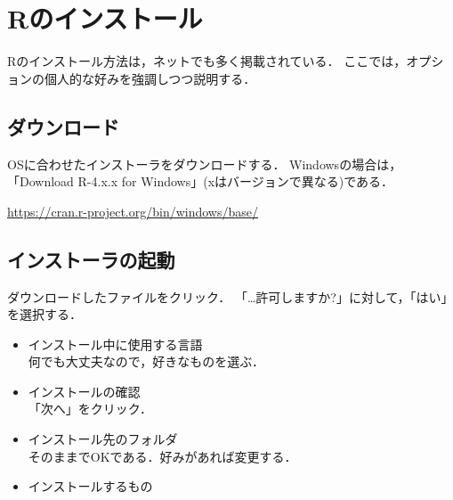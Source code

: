 \documentclass[
]{article}
\providecommand{\tightlist}{%
  \setlength{\itemsep}{0pt}\setlength{\parskip}{0pt}}
\begin{document}
\hypertarget{install}{%
\section{Rのインストール}\label{install}}

Rのインストール方法は，ネットでも多く掲載されている．
ここでは，オプションの個人的な好みを強調しつつ説明する．

\hypertarget{ux30c0ux30a6ux30f3ux30edux30fcux30c9}{%
\subsection{ダウンロード}\label{ux30c0ux30a6ux30f3ux30edux30fcux30c9}}

OSに合わせたインストーラをダウンロードする．
Windowsの場合は，「Download R-4.x.x for Windows」(xはバージョンで異なる)である．

\url{https://cran.r-project.org/bin/windows/base/}

\hypertarget{ux30a4ux30f3ux30b9ux30c8ux30fcux30e9ux306eux8d77ux52d5}{%
\subsection{インストーラの起動}\label{ux30a4ux30f3ux30b9ux30c8ux30fcux30e9ux306eux8d77ux52d5}}

ダウンロードしたファイルをクリック．
「\ldots 許可しますか?」に対して，「はい」を選択する．

\begin{itemize}
\tightlist
\item
  インストール中に使用する言語\\
  何でも大丈夫なので，好きなものを選ぶ．
\end{itemize}

\begin{itemize}
\tightlist
\item
  インストールの確認\\
  「次へ」をクリック．
\end{itemize}

\begin{itemize}
\tightlist
\item
  インストール先のフォルダ\\
  そのままでOKである．好みがあれば変更する．
\end{itemize}

\begin{itemize}
\tightlist
\item
  インストールするもの
\end{itemize}
\end{document}
